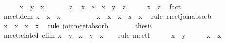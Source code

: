 \begin{isabellebody}
\isanewline
\ \ \ \ \isamarkupfalse%
\ {\isachardoublequoteopen}x\ {\isasymsqinter}\ y\ {\isasymsqsubseteq}\ x{\isachardoublequoteclose}\ \isacommand{{\isachardot}{\isachardot}}\isamarkupfalse%
\isanewline
\ \ \ \ \isamarkupfalse%
\ z\ \isamarkupfalse%
\ {\isachardoublequoteopen}x\ {\isasymsqsubseteq}\ z{\isachardoublequoteclose}\ \ {\isachardoublequoteopen}x\ {\isasymsqinter}\ y\ {\isasymsqsubseteq}\ z{\isachardoublequoteclose}\isanewline
\ \ \ \ \isamarkupfalse%
\ {\isachardoublequoteopen}x\ {\isasymsqsubseteq}\ z{\isachardoublequoteclose}\ \isamarkupfalse%
\ fact\isanewline
\ \ \isamarkupfalse%
\isanewline
\isanewline
\ \ \isamarkupfalse%
\ meet{\isacharunderscore}idem{\isacharcolon}\ {\isachardoublequoteopen}x\ {\isasymsqinter}\ x\ {\isacharequal}\ x{\isachardoublequoteclose}\isanewline
\ \ \isamarkupfalse%
\ {\isacharminus}\isanewline
\ \ \ \ \isamarkupfalse%
\ {\isachardoublequoteopen}x\ {\isasymsqinter}\ {\isacharparenleft}x\ {\isasymsqunion}\ {\isacharparenleft}x\ {\isasymsqinter}\ x{\isacharparenright}{\isacharparenright}\ {\isacharequal}\ x{\isachardoublequoteclose}\ \isamarkupfalse%
\ {\isacharparenleft}rule\ meet{\isacharunderscore}join{\isacharunderscore}absorb{\isacharparenright}\isanewline
\ \ \ \ \isamarkupfalse%
\ \isamarkupfalse%
\ {\isachardoublequoteopen}x\ {\isasymsqunion}\ {\isacharparenleft}x\ {\isasymsqinter}\ x{\isacharparenright}\ {\isacharequal}\ x{\isachardoublequoteclose}\ \isamarkupfalse%
\ {\isacharparenleft}rule\ join{\isacharunderscore}meet{\isacharunderscore}absorb{\isacharparenright}\isanewline
\ \ \ \ \isamarkupfalse%
\ \isamarkupfalse%
\ {\isacharquery}thesis\ \isacommand{{\isachardot}}\isamarkupfalse%
\isanewline
\ \ \isamarkupfalse%
\isanewline
\isanewline
\ \ \isamarkupfalse%
\ meet{\isacharunderscore}related\ {\isacharbrackleft}elim{\isacharquery}{\isacharbrackright}{\isacharcolon}\ {\isachardoublequoteopen}x\ {\isasymsqsubseteq}\ y\ {\isasymLongrightarrow}\ x\ {\isasymsqinter}\ y\ {\isacharequal}\ x{\isachardoublequoteclose}\isanewline
\ \ \isamarkupfalse%
\ {\isacharparenleft}rule\ meetI{\isacharparenright}\isanewline
\ \ \ \ \isamarkupfalse%
\ {\isachardoublequoteopen}x\ {\isasymsqsubseteq}\ y{\isachardoublequoteclose}\isanewline
\ \ \ \ \isamarkupfalse%
\ {\isachardoublequoteopen}x\ {\isasymsqsubseteq}\ x{\isachardoublequoteclose}\ \isacommand{{\isachardot}{\isachardot}}\isamarkupfalse%

\end{isabellebody}
